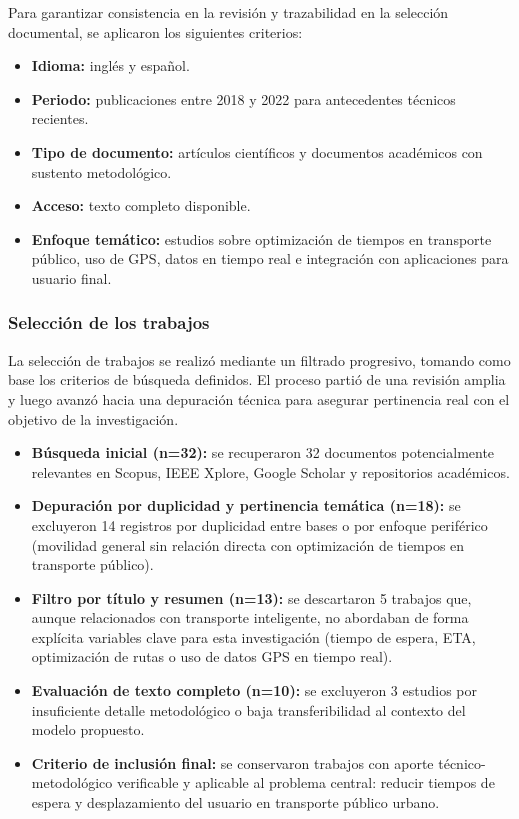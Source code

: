 Para garantizar consistencia en la revisión y trazabilidad en la selección documental, se aplicaron los siguientes criterios:

\begin{itemize}
    \item \textbf{Idioma:} inglés y español.
    \item \textbf{Periodo:} publicaciones entre 2018 y 2022 para antecedentes técnicos recientes.
    \item \textbf{Tipo de documento:} artículos científicos y documentos académicos con sustento metodológico.
    \item \textbf{Acceso:} texto completo disponible.
    \item \textbf{Enfoque temático:} estudios sobre optimización de tiempos en transporte público, uso de GPS, datos en tiempo real e integración con aplicaciones para usuario final.
\end{itemize}

\subsubsection{Selección de los trabajos}

La selección de trabajos se realizó mediante un filtrado progresivo, tomando como base los criterios de búsqueda definidos. El proceso partió de una revisión amplia y luego avanzó hacia una depuración técnica para asegurar pertinencia real con el objetivo de la investigación.

\begin{itemize}
    \item \textbf{Búsqueda inicial (n=32):} se recuperaron 32 documentos potencialmente relevantes en Scopus, IEEE Xplore, Google Scholar y repositorios académicos.
    \item \textbf{Depuración por duplicidad y pertinencia temática (n=18):} se excluyeron 14 registros por duplicidad entre bases o por enfoque periférico (movilidad general sin relación directa con optimización de tiempos en transporte público).
    \item \textbf{Filtro por título y resumen (n=13):} se descartaron 5 trabajos que, aunque relacionados con transporte inteligente, no abordaban de forma explícita variables clave para esta investigación (tiempo de espera, ETA, optimización de rutas o uso de datos GPS en tiempo real).
    \item \textbf{Evaluación de texto completo (n=10):} se excluyeron 3 estudios por insuficiente detalle metodológico o baja transferibilidad al contexto del modelo propuesto.
    \item \textbf{Criterio de inclusión final:} se conservaron trabajos con aporte técnico-metodológico verificable y aplicable al problema central: reducir tiempos de espera y desplazamiento del usuario en transporte público urbano.
\end{itemize}

